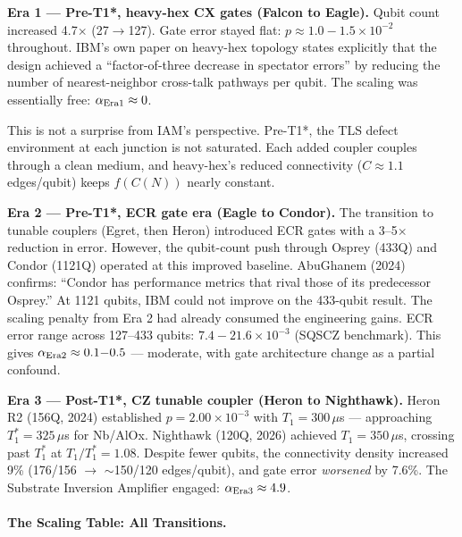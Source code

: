 \documentclass[12pt,a4paper]{article}
\begin{document}
\textbf{Era 1 --- Pre-T1*, heavy-hex CX gates (Falcon to Eagle).}
Qubit count increased 4.7$\times$ (27$\to$127). Gate error stayed flat:
$p \approx 1.0{-}1.5\times10^{-2}$ throughout. IBM's own paper on
heavy-hex topology states explicitly that the design achieved a
``factor-of-three decrease in spectator errors'' by reducing the number
of nearest-neighbor cross-talk pathways per qubit. The scaling was
essentially free: $\alpha_{\rm Era1} \approx 0$.

This is not a surprise from IAM's perspective. Pre-T1*, the TLS defect
environment at each junction is not saturated. Each added coupler
couples through a clean medium, and heavy-hex's reduced connectivity
($C \approx 1.1$ edges/qubit) keeps $f(C(N))$ nearly constant.

\textbf{Era 2 --- Pre-T1*, ECR gate era (Eagle to Condor).}
The transition to tunable couplers (Egret, then Heron) introduced ECR
gates with a 3--5$\times$ reduction in error. However, the qubit-count
push through Osprey (433Q) and Condor (1121Q) operated at this improved
baseline. AbuGhanem (2024) confirms: ``Condor has performance metrics
that rival those of its predecessor Osprey.'' At 1121 qubits, IBM
could not improve on the 433-qubit result. The scaling penalty from
Era 2 had already consumed the engineering gains. ECR error range
across 127--433 qubits: $7.4{-}21.6\times10^{-3}$ (SQSCZ benchmark).
This gives $\alpha_{\rm Era2} \approx 0.1{-}0.5$ --- moderate, with
gate architecture change as a partial confound.

\textbf{Era 3 --- Post-T1*, CZ tunable coupler (Heron to Nighthawk).}
Heron R2 (156Q, 2024) established $p = 2.00\times10^{-3}$ with
$T_1 = 300\,\mu$s --- approaching $T_1^* = 325\,\mu$s for Nb/AlOx.
Nighthawk (120Q, 2026) achieved $T_1 = 350\,\mu$s, crossing past
$T_1^*$ at $T_1/T_1^* = 1.08$. Despite fewer qubits, the connectivity
density increased 9\% (176/156 $\to$ $\sim$150/120 edges/qubit),
and gate error \emph{worsened} by 7.6\%. The Substrate Inversion
Amplifier engaged: $\alpha_{\rm Era3} \approx 4.9$.

\paragraph{The Scaling Table: All Transitions.}
\end{document}
